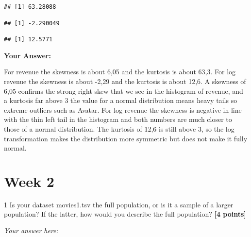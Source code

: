 \documentclass[
]{article}
\newenvironment{Shaded}{\begin{snugshade}}{\end{snugshade}}
\newcommand{\AttributeTok}[1]{\textcolor[rgb]{0.13,0.29,0.53}{#1}}
\newcommand{\ConstantTok}[1]{\textcolor[rgb]{0.56,0.35,0.01}{#1}}
\newcommand{\FunctionTok}[1]{\textcolor[rgb]{0.13,0.29,0.53}{\textbf{#1}}}
\newcommand{\NormalTok}[1]{#1}
\newcommand{\SpecialCharTok}[1]{\textcolor[rgb]{0.81,0.36,0.00}{\textbf{#1}}}
\begin{document}
\begin{verbatim}
## [1] 63.28088
\end{verbatim}

\begin{Shaded}
\end{Shaded}

\begin{verbatim}
## [1] -2.290049
\end{verbatim}

\begin{Shaded}
\end{Shaded}

\begin{verbatim}
## [1] 12.5771
\end{verbatim}

\textbf{Your Answer:}

For revenue the skewness is about 6,05 and the kurtosis is about 63,3.
For log revenue the skewness is about -2,29 and the kurtosis is about
12,6. A skewness of 6,05 confirms the strong right skew that we see in
the histogram of revenue, and a kurtosis far above 3 the value for a
normal distribution means heavy tails so extreme outliers such as
Avatar. For log revenue the skewness is negative in line with the thin
left tail in the histogram and both numbers are much closer to those of
a normal distribution. The kurtosis of 12,6 is still above 3, so the log
transformation makes the distribution more symmetric but does not make
it fully normal.

\section{Week 2}\label{week-2}

1 Is your dataset movies1.tsv the full population, or is it a sample of
a larger population? If the latter, how would you describe the full
population? \textbf{[4 points]}

\emph{Your answer here:}
\end{document}
